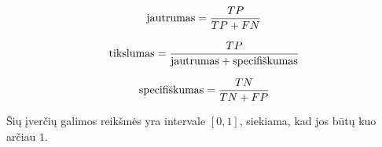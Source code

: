 \begin{equation}
\text{jautrumas} = {TP \over {TP + FN}}
\end{equation}

\begin{equation}
\text{tikslumas} = {TP \over {\text{jautrumas} + \text{specifiškumas} }}
\end{equation}

\begin{equation}
\text{specifiškumas} = {TN \over {TN + FP}}
\end{equation}

Šių įverčių galimos reikšmės yra intervale $[0, 1]$, siekiama, kad jos būtų kuo arčiau $1$.
